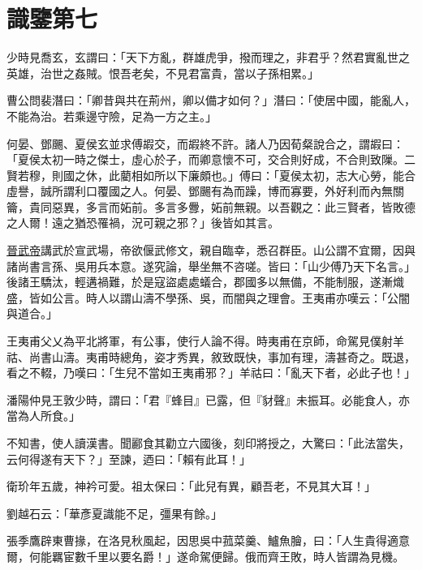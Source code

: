 \chapter{識鑒第七}

\href{https://zh.wikipedia.org/wiki/zh:\%E6\%9B\%B9\%E6\%93\%8D}少時見喬玄，玄謂曰：「天下方亂，群雄虎爭，撥而理之，非君乎？然君實亂世之英雄，治世之姦賊。恨吾老矣，不見君富貴，當以子孫相累。」

曹公問裴潛曰：「卿昔與\href{https://zh.wikipedia.org/wiki/zh:\%E5\%8A\%89\%E5\%82\%99}共在荊州，卿以備才如何？」潛曰：「使居中國，能亂人，不能為治。若乘邊守險，足為一方之主。」

何晏、鄧颺、夏侯玄並求傅嘏交，而嘏終不許。諸人乃因荀粲說合之，謂嘏曰：「夏侯太初一時之傑士，虛心於子，而卿意懷不可，交合則好成，不合則致隟。二賢若穆，則國之休，此藺相如所以下廉頗也。」傅曰：「夏侯太初，志大心勞，能合虛譽，誠所謂利口覆國之人。何晏、鄧颺有為而躁，博而寡要，外好利而內無關籥，貴同惡異，多言而妬前。多言多釁，妬前無親。以吾觀之：此三賢者，皆敗德之人爾！遠之猶恐罹禍，況可親之邪？」後皆如其言。

\href{https://zh.wikipedia.org/wiki/zh:\%E6\%99\%89\%E6\%AD\%A6\%E5\%B8\%9D}{晉武帝}講武於宣武場，帝欲偃武修文，親自臨幸，悉召群臣。山公謂不宜爾，因與諸尚書言孫、吳用兵本意。遂究論，舉坐無不咨嗟。皆曰：「山少傅乃天下名言。」後諸王驕汰，輕遘禍難，於是寇盜處處蟻合，郡國多以無備，不能制服，遂漸熾盛，皆如公言。時人以謂山濤不學孫、吳，而闇與之理會。王夷甫亦嘆云：「公闇與道合。」

王夷甫父乂為平北將軍，有公事，使行人論不得。時夷甫在京師，命駕見僕射羊祜、尚書山濤。夷甫時總角，姿才秀異，敘致既快，事加有理，濤甚奇之。既退，看之不輟，乃嘆曰：「生兒不當如王夷甫邪？」羊祜曰：「亂天下者，必此子也！」

潘陽仲見王敦少時，謂曰：「君『蜂目』已露，但『豺聲』未振耳。必能食人，亦當為人所食。」

\href{https://zh.wikipedia.org/wiki/zh:\%E7\%9F\%B3\%E5\%8B\%92}不知書，使人讀漢書。聞酈食其勸立六國後，刻印將授之，大驚曰：「此法當失，云何得遂有天下？」至\href{https://zh.wikipedia.org/wiki/zh:\%E5\%BC\%B5\%E8\%89\%AF}諫，迺曰：「賴有此耳！」

衛玠年五歲，神衿可愛。祖太保曰：「此兒有異，顧吾老，不見其大耳！」

劉越石云：「華彥夏識能不足，彊果有餘。」

張季鷹辟\href{https://zh.wikipedia.org/wiki/zh:\%E5\%8F\%B8\%E9\%A6\%AC\%E5\%86\%8F}東曹掾，在洛見秋風起，因思吳中菰菜羹、鱸魚膾，曰：「人生貴得適意爾，何能羈宦數千里以要名爵！」遂命駕便歸。俄而齊王敗，時人皆謂為見機。

